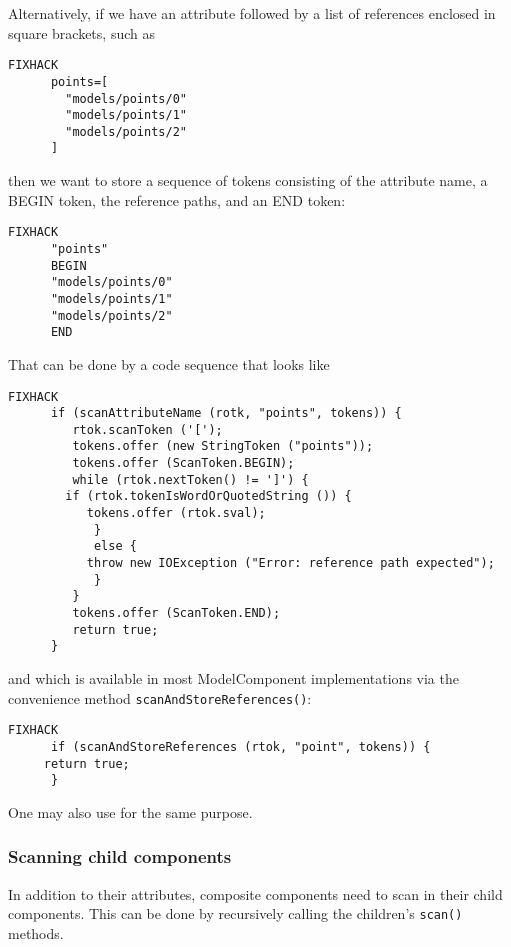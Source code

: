 \documentclass{article}
\begin{document}
Alternatively, if we have an attribute followed by 
a list of references enclosed in square brackets, such as
\begin{lstlisting}FIXHACK
      points=[
        "models/points/0"
        "models/points/1"
        "models/points/2"
      ]
\end{lstlisting}
then we want to store a sequence of tokens consisting of the
attribute name, a BEGIN token, the reference paths, and an END token:
\begin{lstlisting}FIXHACK
      "points"
      BEGIN
      "models/points/0"
      "models/points/1"
      "models/points/2"
      END
\end{lstlisting}
That can be done by a code sequence that looks like
\begin{lstlisting}FIXHACK
      if (scanAttributeName (rotk, "points", tokens)) {
         rtok.scanToken ('[');
         tokens.offer (new StringToken ("points"));
         tokens.offer (ScanToken.BEGIN);
         while (rtok.nextToken() != ']') {
	    if (rtok.tokenIsWordOrQuotedString ()) {
	       tokens.offer (rtok.sval);
            }
            else {
	       throw new IOException ("Error: reference path expected");
            }
         }
         tokens.offer (ScanToken.END);
         return true;
      }
\end{lstlisting}
and which is available in most ModelComponent implementations
via the convenience method {\tt scanAndStoreReferences()}:
\begin{lstlisting}FIXHACK
      if (scanAndStoreReferences (rtok, "point", tokens)) {
	 return true;
      }
\end{lstlisting}
One may also use
for the same purpose.

\subsubsection{Scanning child components}

In addition to their attributes, composite components need to scan in
their child components. This can be done by recursively calling the
children's {\tt scan()} methods.
\end{document}
